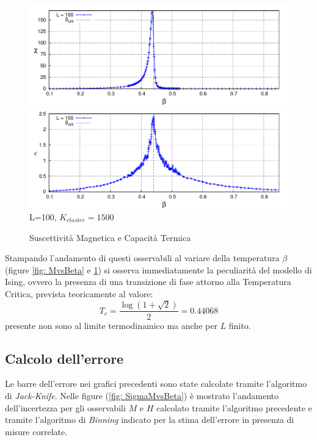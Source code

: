 \begin {figure}[h!p]
    \begin{center}
	\caption[1) ParteA\_ChivsBeta.cpp \quad $/\;$ 2)  ParteA\_cvsBeta.cpp ]{Suscettività Magnetica e Capacità Termica}\label{fig: ChivsBeta}
        \includegraphics[scale=0.8]{Immagini/ParteA/ChivsBeta}
     \newline    
        \includegraphics[scale=0.8]{Immagini/ParteA/cvsBeta}
     \newline   
		\footnotesize L=100, $K_{cluster} = 1500$  
    \end{center}
 \end {figure}

Stampando l'andamento di questi osservabili al variare della temperatura $\beta$ (figure \ref{fig: MvsBeta} e \ref{fig: ChivsBeta}) si osserva immediatamente la peculiarità del modello di Ising, ovvero la presenza di una transizione di fase attorno alla Temperatura Critica, prevista teoricamente al valore:
$$T_c =   \dfrac{\log( 1 +\sqrt{2})}{2}  = 0.44068$$
presente non sono al limite termodinamico ma anche per $L$ finito. 

\clearpage
\subsection{Calcolo dell'errore}
Le barre dell'errore nei grafici precedenti sono state calcolate tramite l'algoritmo di \emph{Jack-Knife}.
Nelle figure (\ref{fig: SigmaMvsBeta}) è mostrato l'andamento dell'incertezza per gli osservabili $M$ e $H$ calcolato tramite l'algoritmo precedente e tramite l'algoritmo di \emph{Binning} indicato per la stima dell'errore in presenza di misure correlate.

